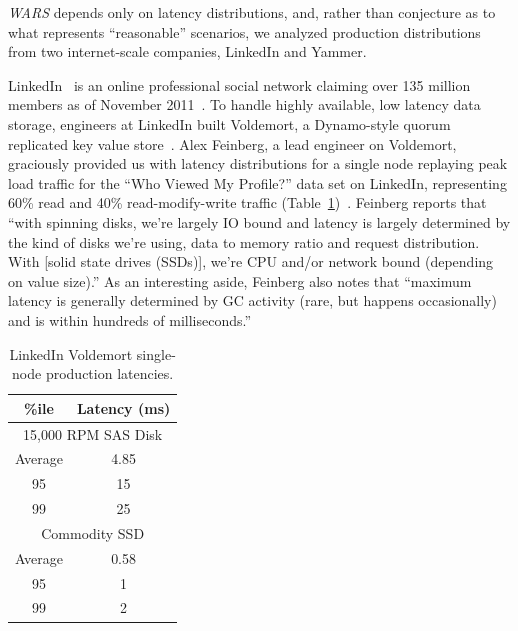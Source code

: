 \documentclass{vldb}
\begin{document}
\textit{WARS} depends only on latency distributions, and, rather than
conjecture as to what represents ``reasonable'' scenarios, we analyzed
production distributions from two internet-scale companies, LinkedIn
and Yammer.

LinkedIn~\cite{linkedin} is an online professional social network
claiming over 135 million members as of November
2011~\cite{linkedinmembers}. To handle highly available, low latency
data storage, engineers at LinkedIn built Voldemort, a Dynamo-style
quorum replicated key value store~\cite{voldemort, voldemortpub}.
Alex Feinberg, a lead engineer on Voldemort, graciously provided us
with latency distributions for a single node replaying peak load
traffic for the ``Who Viewed My Profile?'' data set on LinkedIn,
representing 60\% read and 40\% read-modify-write traffic
(Table~\ref{table:linkedin})~\cite{feinbergpc}.  Feinberg reports that
``with spinning disks, we're largely IO bound and latency is largely
determined by the kind of disks we're using, data to memory ratio and
request distribution.  With [solid state drives (SSDs)], we're CPU
and/or network bound (depending on value size).''  As an interesting
aside, Feinberg also notes that ``maximum latency is generally
determined by GC activity (rare, but happens occasionally) and is
within hundreds of milliseconds.''

\begin{table}
\centering
\begin{tabular}{|c|c|}
\hline
\%ile & Latency (ms) \\
\hline
\multicolumn{2}{|c|}{ 15,000 RPM SAS Disk}\\
\hline
Average & 4.85\\
95 & 15\\
99 & 25\\
\hline
\multicolumn{2}{|c|}{ Commodity SSD }\\
\hline
Average & 0.58 \\
95 & 1\\
99 & 2\\
\hline
\end{tabular}
\caption{LinkedIn Voldemort single-node production latencies.}
\label{table:linkedin}
\end{table}
\end{document}
